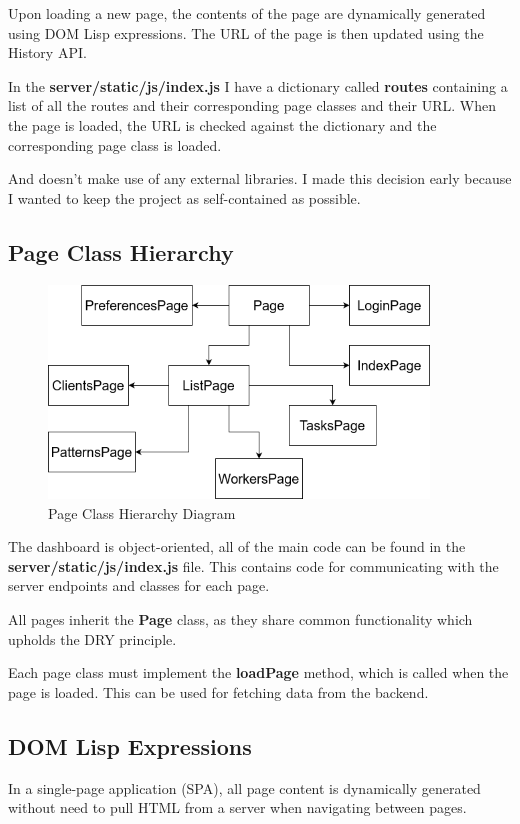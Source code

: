 Upon loading a new page, the contents of the page are
dynamically generated using DOM Lisp expressions.
The URL of the page is then updated using the History API.

In the \textbf{server/static/js/index.js} I have a dictionary called
\textbf{routes} containing a list of all the routes and their corresponding
page classes and their URL.
When the page is loaded, the URL is checked against the dictionary
and the corresponding page class is loaded.

And doesn't make use of any external libraries.
I made this decision early because I wanted to keep the project as self-contained as possible.

\subsection {Page Class Hierarchy}

\begin{figure}[h!]
    \includegraphics[width=0.9\textwidth]{images/diagrams/dashboard_hierarchy.drawio}
    \caption{Page Class Hierarchy Diagram}
    \label{image:sysArchitecture}
\end{figure}

The dashboard is object-oriented,
all of the main code can be found in the \textbf{server/static/js/index.js} file.
This contains code for communicating with the server endpoints and classes for each page.

All pages inherit the \textbf{Page} class,
as they share common functionality which upholds the DRY principle.

Each page class must implement the \textbf{loadPage} method,
which is called when the page is loaded.
This can be used for fetching data from the backend.

\subsection{DOM Lisp Expressions}
In a single-page application (SPA), all page content is dynamically generated without
need to pull HTML from a server when navigating between pages.

